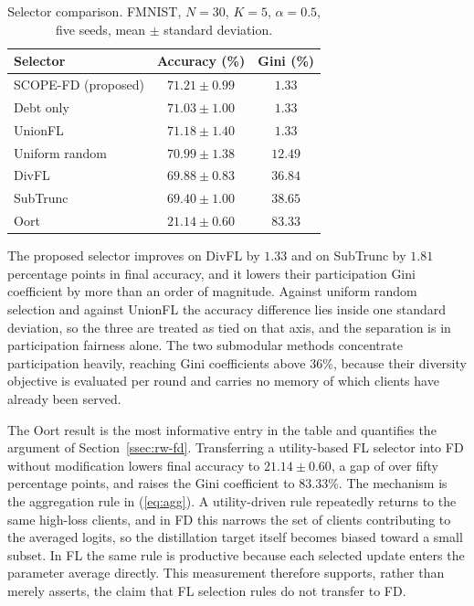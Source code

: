 \documentclass[journal]{IEEEtran}
\begin{document}
{\begin{table}[t]
\centering
\caption{Selector comparison. FMNIST, $N=30$, $K=5$, $\alpha=0.5$, five seeds, mean $\pm$ standard deviation.}
\label{tab:baselines}
\renewcommand{\arraystretch}{1.15}
\footnotesize
\setlength{\tabcolsep}{4pt}
\begin{tabular}{@{}lcc@{}}
\toprule
\textbf{Selector} & \textbf{Accuracy (\%)} & \textbf{Gini (\%)} \\
\midrule
SCOPE-FD (proposed) & $71.21 \pm 0.99$ & $1.33$ \\
Debt only           & $71.03 \pm 1.00$ & $1.33$ \\
UnionFL \cite{castillo2025subtrunc}  & $71.18 \pm 1.40$ & $1.33$ \\
Uniform random      & $70.99 \pm 1.38$ & $12.49$ \\
DivFL \cite{balakrishnan2022divfl}   & $69.88 \pm 0.83$ & $36.84$ \\
SubTrunc \cite{castillo2025subtrunc} & $69.40 \pm 1.00$ & $38.65$ \\
Oort \cite{lai2021oort}              & $21.14 \pm 0.60$ & $83.33$ \\
\bottomrule
\end{tabular}
\end{table}

The proposed selector improves on DivFL by $1.33$ and on SubTrunc by $1.81$ percentage points in final accuracy, and it lowers their participation Gini coefficient by more than an order of magnitude. Against uniform random selection and against UnionFL the accuracy difference lies inside one standard deviation, so the three are treated as tied on that axis, and the separation is in participation fairness alone. The two submodular methods concentrate participation heavily, reaching Gini coefficients above $36\%$, because their diversity objective is evaluated per round and carries no memory of which clients have already been served.

The Oort result is the most informative entry in the table and quantifies the argument of Section~\ref{ssec:rw-fd}. Transferring a utility-based FL selector into FD without modification lowers final accuracy to $21.14 \pm 0.60$, a gap of over fifty percentage points, and raises the Gini coefficient to $83.33\%$. The mechanism is the aggregation rule in (\ref{eq:agg}). A utility-driven rule repeatedly returns to the same high-loss clients, and in FD this narrows the set of clients contributing to the averaged logits, so the distillation target itself becomes biased toward a small subset. In FL the same rule is productive because each selected update enters the parameter average directly. This measurement therefore supports, rather than merely asserts, the claim that FL selection rules do not transfer to FD.

}
\end{document}

